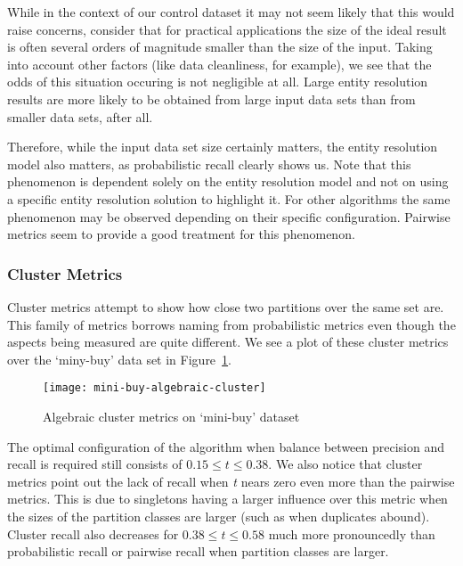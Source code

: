 While in the context of our control dataset it may not seem likely that this
would raise concerns, consider that for practical applications the size of the
ideal result is often several orders of magnitude smaller than the size of the
input.
Taking into account other factors (like data cleanliness, for example), we see
that the odds of this situation occuring is not negligible at all.
Large entity resolution results are more likely to be obtained from large input
data sets than from smaller data sets, after all.

Therefore, while the input data set size certainly matters, the entity
resolution model also matters, as probabilistic recall clearly shows us.
Note that this phenomenon is dependent solely on the entity resolution model and
not on using a specific entity resolution solution to highlight it.
For other algorithms the same phenomenon may be observed depending on their
specific configuration.
Pairwise metrics seem to provide a good treatment for this phenomenon.

\subsubsection{Cluster Metrics}

Cluster metrics attempt to show how close two partitions over the same set are.
This family of metrics borrows naming from probabilistic metrics even though
the aspects being measured are quite different.
We see a plot of these cluster metrics over the `miny-buy' data set in
Figure~\ref{fig:mini-alg-cluster}.

\begin{figure}[htbp]
    \centering
    \captionsetup{justification=centering}
    \texttt{[image: mini-buy-algebraic-cluster]}
    \caption{Algebraic cluster metrics on `mini-buy' dataset}\label{fig:mini-alg-cluster}
\end{figure}

The optimal configuration of the algorithm when balance between precision and
recall is required still consists of $0.15 \le t \le 0.38$.
We also notice that cluster metrics point out the lack of recall when \textit{t}
nears zero even more than the pairwise metrics.
This is due to singletons having a larger influence over this metric when the
sizes of the partition classes are larger (such as when duplicates abound).
Cluster recall also decreases for $0.38 \le t \le 0.58$ much more pronouncedly
than probabilistic recall or pairwise recall when partition classes are larger.

